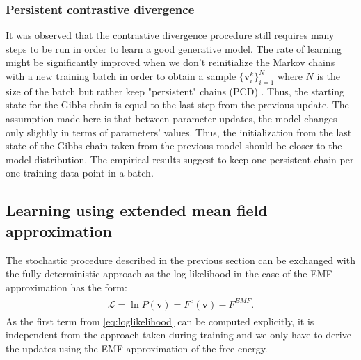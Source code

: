 \documentclass[../report/report.tex]{subfiles}
\begin{document}
\subsubsection{Persistent contrastive divergence}  
It was observed that the contrastive divergence procedure still requires many steps to be run in order to learn a good generative model. The rate of learning might be significantly improved when we don't reinitialize the Markov chains with a new training batch in order to obtain a sample $\{\mathbf{v}_i^k\}_{i=1}^N$ where $N$ is the size of the batch but rather keep "persistent" chains (PCD) \cite{tieleman2008training}. Thus, the starting state for the Gibbs chain is equal to the last step from the previous update. The assumption made here is that between parameter updates, the model changes only slightly in terms of parameters' values\cite{neal1992connectionist}. Thus, the initialization from the last state of the Gibbs chain taken from the previous model should be closer to the model distribution. The empirical results suggest to keep one persistent chain per one training data point in a batch.

\subsection{Learning using extended mean field approximation}
The stochastic procedure described in the previous section can be exchanged with the fully deterministic approach as the log-likelihood in the case of the EMF approximation has the form:
\begin{align}
\begin{split}
\mathcal{L} = \ln P(\mathbf{v}) = F^c(\mathbf{v}) - F^{EMF}.
\end{split}
\label{eq:emfLL}
\end{align}
As the first term from \ref{eq:loglikelihood} can be computed explicitly, it is independent from the approach taken during training and we only have to derive the updates using the EMF approximation of the free energy.
\end{document}
